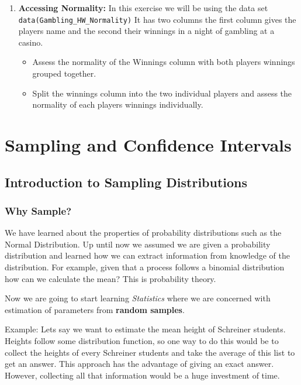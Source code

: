 \documentclass[
]{book}
\providecommand{\tightlist}{%
  \setlength{\itemsep}{0pt}\setlength{\parskip}{0pt}}
\theoremstyle{definition}
\theoremstyle{definition}
\theoremstyle{definition}
\theoremstyle{definition}
\theoremstyle{remark}
\begin{document}
\begin{enumerate}
\def\labelenumi{\arabic{enumi}.}
\tightlist
\item
  \textbf{Accessing Normality:} In this exercise we will be using the data set \texttt{data(Gambling\_HW\_Normality)} It has two columns the first column gives the players name and the second their winnings in a night of gambling at a casino.

  \begin{itemize}
  \tightlist
  \item
    Assess the normality of the Winnings column with both players winnings grouped together.
  \item
    Split the winnings column into the two individual players and assess the normality of each players winnings individually.
  \end{itemize}
\end{enumerate}

\hypertarget{part-sampling-and-confidence-intervals}{%
\part{Sampling and Confidence Intervals}\label{part-sampling-and-confidence-intervals}}

\hypertarget{introduction-to-sampling-distributions}{%
\chapter{Introduction to Sampling Distributions}\label{introduction-to-sampling-distributions}}

\hypertarget{why-sample}{%
\section{Why Sample?}\label{why-sample}}

We have learned about the properties of probability distributions such as the Normal Distribution. Up until now we assumed we are given a probability distribution and learned how we can extract information from knowledge of the distribution. For example, given that a process follows a binomial distribution how can we calculate the mean? This is probability theory.

Now we are going to start learning \emph{Statistics} where we are concerned with estimation of parameters from \textbf{random samples}.

Example: Lets say we want to estimate the mean height of Schreiner students. Heights follow some distribution function, so one way to do this would be to collect the heights of every Schreiner students and take the average of this list to get an answer. This approach has the advantage of giving an exact answer. However, collecting all that information would be a huge investment of time.
\end{document}

